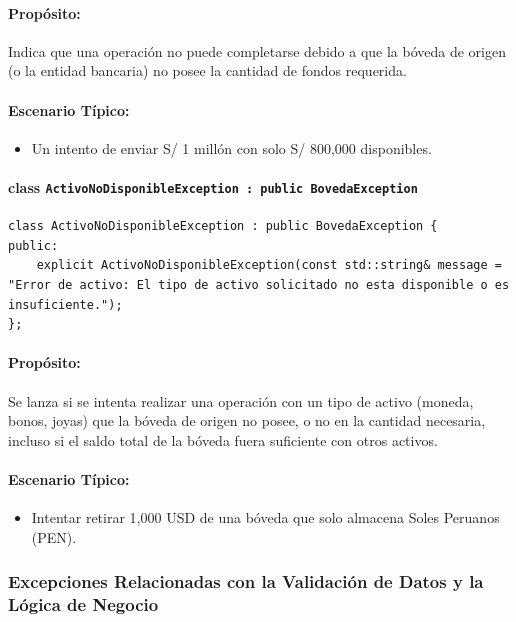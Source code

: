 \documentclass{article}
\newcommand{\inlinecode}[1]{\texttt{#1}}
\begin{document}
\paragraph*{Propósito:} Indica que una operación no puede completarse debido a que la bóveda de origen (o la entidad bancaria) no posee la cantidad de fondos requerida.

\paragraph*{Escenario Típico:}
\begin{itemize}
    \item Un intento de enviar S/ 1 millón con solo S/ 800,000 disponibles.
\end{itemize}

\paragraph*{\textbf{class \inlinecode{ActivoNoDisponibleException : public BovedaException}}}
\begin{lstlisting}
class ActivoNoDisponibleException : public BovedaException {
public:
    explicit ActivoNoDisponibleException(const std::string& message = "Error de activo: El tipo de activo solicitado no esta disponible o es insuficiente.");
};
\end{lstlisting}
\paragraph*{Propósito:} Se lanza si se intenta realizar una operación con un tipo de activo (moneda, bonos, joyas) que la bóveda de origen no posee, o no en la cantidad necesaria, incluso si el saldo total de la bóveda fuera suficiente con otros activos.

\paragraph*{Escenario Típico:}
\begin{itemize}
    \item Intentar retirar 1,000 USD de una bóveda que solo almacena Soles Peruanos (PEN).
\end{itemize}

\subsubsection*{Excepciones Relacionadas con la Validación de Datos y la Lógica de Negocio}
\end{document}
